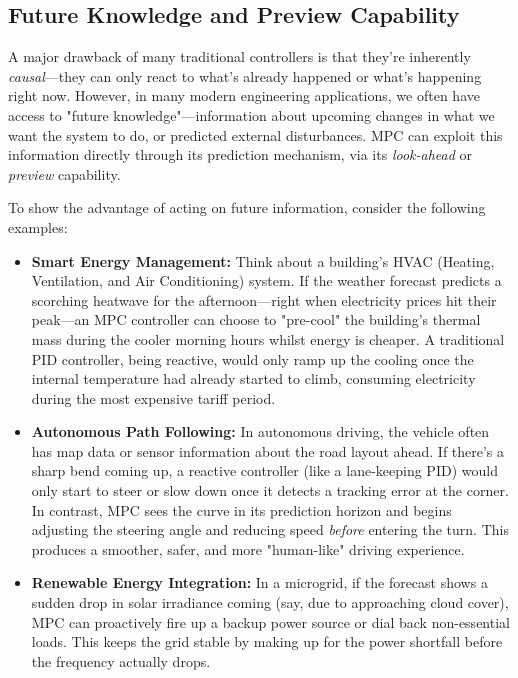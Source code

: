 \subsection{Future Knowledge and Preview Capability}

A major drawback of many traditional controllers is that they're inherently \textit{causal}—they can only react to what's already happened or what's happening right now. However, in many modern engineering applications, we often have access to "future knowledge"—information about upcoming changes in what we want the system to do, or predicted external disturbances. MPC can exploit this information directly through its prediction mechanism, via its \textit{look-ahead} or \textit{preview} capability.

To show the advantage of acting on future information, consider the following examples:
\begin{itemize}
	\item \textbf{Smart Energy Management:} Think about a building's HVAC (Heating, Ventilation, and Air Conditioning) system. If the weather forecast predicts a scorching heatwave for the afternoon—right when electricity prices hit their peak—an MPC controller can choose to "pre-cool" the building's thermal mass during the cooler morning hours whilst energy is cheaper. A traditional PID controller, being reactive, would only ramp up the cooling once the internal temperature had already started to climb, consuming electricity during the most expensive tariff period.
	
	\item \textbf{Autonomous Path Following:} In autonomous driving, the vehicle often has map data or sensor information about the road layout ahead. If there's a sharp bend coming up, a reactive controller (like a lane-keeping PID) would only start to steer or slow down once it detects a tracking error at the corner. In contrast, MPC sees the curve in its prediction horizon and begins adjusting the steering angle and reducing speed \textit{before} entering the turn. This produces a smoother, safer, and more "human-like" driving experience.
	
	\item \textbf{Renewable Energy Integration:} In a microgrid, if the forecast shows a sudden drop in solar irradiance coming (say, due to approaching cloud cover), MPC can proactively fire up a backup power source or dial back non-essential loads. This keeps the grid stable by making up for the power shortfall before the frequency actually drops.
\end{itemize}

